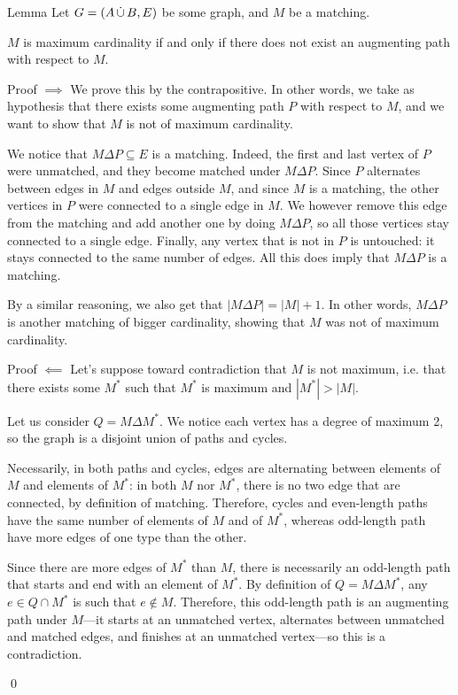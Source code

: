 \documentclass[a4paper]{article}
\begin{document}
\begin{parag}{Lemma}
    Let $G = \left(A \dcup B, E\right)$ be some graph, and $M$ be a matching.

    $M$ is maximum cardinality if and only if there does not exist an augmenting path with respect to $M$.

    \begin{subparag}{Proof $\implies$}
        We prove this by the contrapositive. In other words, we take as hypothesis that there exists some augmenting path $P$ with respect to $M$, and we want to show that $M$ is not of maximum cardinality.

        We notice that $M \Delta P \subseteq E$ is a matching. Indeed, the first and last vertex of $P$ were unmatched, and they become matched under $M \Delta P$. Since $P$ alternates between edges in $M$ and edges outside $M$, and since $M$ is a matching, the other vertices in $P$ were connected to a single edge in $M$. We however remove this edge from the matching and add another one by doing $M \Delta P$, so all those vertices stay connected to a single edge. Finally, any vertex that is not in $P$ is untouched: it stays connected to the same number of edges. All this does imply that $M \Delta P$ is a matching.

        By a similar reasoning, we also get that $\left|M \Delta P\right| = \left|M\right| + 1$. In other words, $M \Delta P$ is another matching of bigger cardinality, showing that $M$ was not of maximum cardinality.
    \end{subparag}

    \begin{subparag}{Proof $\impliedby$}
        Let's suppose toward contradiction that $M$ is not maximum, i.e. that there exists some $M^*$ such that $M^*$ is maximum and $\left|M^*\right| > \left|M\right|$.

        Let us consider $Q = M \Delta M^*$. We notice each vertex has a degree of maximum 2, so the graph is a disjoint union of paths and cycles.

        Necessarily, in both paths and cycles, edges are alternating between elements of $M$ and elements of $M^*$: in both $M$ nor $M^*$, there is no two edge that are connected, by definition of matching. Therefore, cycles and even-length paths have the same number of elements of $M$ and of $M^*$, whereas odd-length path have more edges of one type than the other.

        Since there are more edges of $M^*$ than $M$, there is necessarily an odd-length path that starts and end with an element of $M^*$. By definition of $Q = M \Delta M^*$, any $e \in Q \cap M^*$ is such that $e \not \in M$. Therefore, this odd-length path is an augmenting path under $M$---it starts at an unmatched vertex, alternates between unmatched and matched edges, and finishes at an unmatched vertex---so this is a contradiction.

        \qed
    \end{subparag}
\end{parag}
\end{document}
